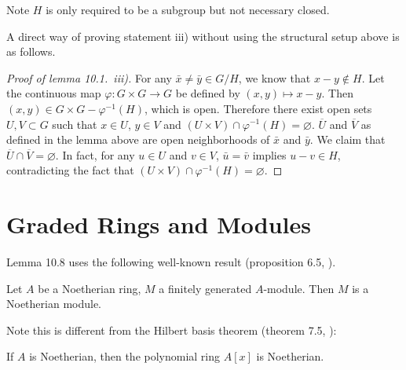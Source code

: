 \documentclass{note}
\begin{document}
\begin{remark*}
  Note $H$ is only required to be a subgroup but not necessary closed.
\end{remark*}

A direct way of proving statement iii) without using the structural
setup above is as follows.

\begin{proof}[Proof of lemma 10.1.~iii)] For any
  $\bar{x} \neq \bar{y} \in G/H$, we know that $x - y \notin H$. Let
  the continuous map $\varphi\colon G\times G \to G$ be defined by
  $(x,y) \mapsto x - y$. Then $(x,y) \in G\times G - \varphi^{-1}(H)$,
  which is open. Therefore there exist open sets $U,V \subset G$ such
  that $x\in U$, $y\in V$ and
  $(U\times V) \cap \varphi^{-1}(H) = \varnothing$. $\overline{U}$ and
  $\overline{V}$ as defined in the lemma above are open neighborhoods
  of $\bar{x}$ and $\bar{y}$. We claim that
  $\overline{U} \cap \overline{V} = \varnothing$. In fact, for any
  $u\in U$ and $v\in V$, $\bar{u} = \bar{v}$ implies
  $u - v \in H$, contradicting the fact that
  $(U\times V) \cap \varphi^{-1}(H) = \varnothing$.  
\end{proof}

\section*{Graded Rings and Modules}
Lemma 10.8 uses the following well-known result (proposition 6.5,
).
\begin{proposition*}
  Let $A$ be a Noetherian ring, $M$ a finitely generated
  $A$-module. Then $M$ is a Noetherian module.
\end{proposition*}
Note this is different from the Hilbert basis theorem (theorem 7.5,
):
\begin{theorem*}
  If $A$ is Noetherian, then the polynomial ring $A[x]$ is Noetherian.
\end{theorem*}
\end{document}
